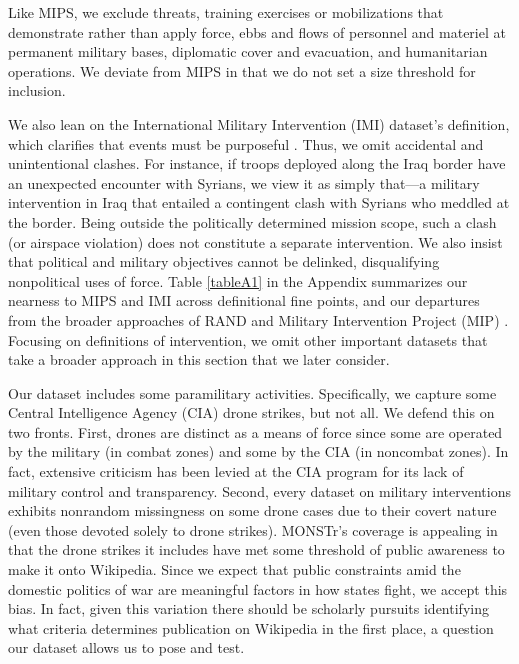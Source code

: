 \documentclass[fleqn,12pt]{article}
\begin{document}
\noindent \doublespacing
Like MIPS, we exclude threats, training exercises or mobilizations that demonstrate rather than apply force, ebbs and flows of personnel and materiel at permanent military bases, diplomatic cover and evacuation, and humanitarian operations. We deviate from MIPS in that we do not set a size threshold for inclusion.

We also lean on the International Military Intervention (IMI) dataset’s definition, which clarifies that events must be purposeful \citep{pearson_internationalmilitaryintervention_1993, kisangani_internationalmilitaryintervention_2008}. Thus, we omit accidental and unintentional clashes. For instance, if troops deployed along the Iraq border have an unexpected encounter with Syrians, we view it as simply that—a military intervention in Iraq that entailed a contingent clash with Syrians who meddled at the border. Being outside the politically determined mission scope, such a clash (or airspace violation) does not constitute a separate intervention. We also insist that political and military objectives cannot be delinked, disqualifying nonpolitical uses of force. Table \ref{tableA1} in the Appendix summarizes our nearness to MIPS and IMI across definitional fine points, and our departures from the broader approaches of RAND \citep{kavanagh_characteristicssuccessfulmilitary_2019} and Military Intervention Project (MIP) \citep{kushi_introducingmilitaryintervention_2022}. Focusing on definitions of intervention, we omit other important datasets that take a broader approach in this section that we later consider.

Our dataset includes some paramilitary activities. Specifically, we capture some Central Intelligence Agency (CIA) drone strikes, but not all. We defend this on two fronts. First, drones are distinct as a means of force since some are operated by the military (in combat zones) and some by the CIA (in noncombat zones). In fact, extensive criticism has been levied at the CIA program for its lack of military control and transparency. Second, every dataset on military interventions exhibits nonrandom missingness on some drone cases due to their covert nature (even those devoted solely to drone strikes). MONSTr’s coverage is appealing in that the drone strikes it includes have met some threshold of public awareness to make it onto Wikipedia. Since we expect that public constraints amid the domestic politics of war are meaningful factors in how states fight, we accept this bias. In fact, given this variation there should be scholarly pursuits identifying what criteria determines publication on Wikipedia in the first place, a question our dataset allows us to pose and test.
\end{document}
